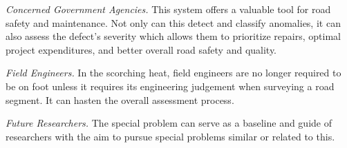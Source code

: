 \textit{Concerned Government Agencies.} This system offers a valuable tool for road safety and maintenance. Not only can this detect and classify anomalies, it can also assess the defect’s severity which allows them to prioritize repairs, optimal project expenditures, and better overall road safety and quality. 


\textit{Field Engineers.} In the scorching heat, field engineers are no longer required to be on foot unless it requires its engineering judgement when surveying a road segment. It can hasten the overall assessment process. 


\textit{Future Researchers.} The special problem can serve as a baseline and guide of researchers with the aim to pursue special problems similar or related to this. 


